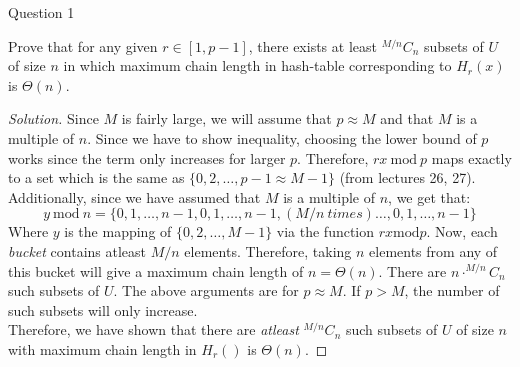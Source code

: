 \begin{solution}{Question 1}\label{ques:1}
    \begin{question}
        Prove that for any given $r \in [1, p-1]$, there exists at least $^{M/n}C_n$ subsets of $U$ of size $n$ in which maximum chain length in hash-table corresponding to $H_r(x)$ is $\Theta(n)$.
    \end{question}
    \tcblower{}
    \begin{proof}[Solution]
      Since $M$ is fairly large, we will assume that $p \approx M$ and that $M$ is a multiple of $n$. Since we have to show inequality, choosing the lower bound of $p$ works since the term only increases for larger $p$. Therefore, $rx\ \text{mod}\ p$ maps exactly to a set which is the same as $\{0, 2, \ldots, p-1 \approx M-1\}$ (from lectures 26, 27). Additionally, since we have assumed that $M$ is a multiple of $n$, we get that:
      \begin{equation}
        y\ \text{mod}\ n = \{0, 1, \ldots, n-1, 0, 1, \ldots, n-1, (M/n\ times)\ldots, 0, 1, \ldots, n-1\}
      \end{equation}
      Where $y$ is the mapping of $\{0, 2, \ldots, M-1\}$ via the function $rx \text{mod} p$. Now, each \textit{bucket} contains atleast $M/n$ elements. Therefore, taking $n$ elements from any of this bucket will give a maximum chain length of $n = \Theta(n)$. There are $n\cdot^{M/n}C_n$ such subsets of $U$. The above arguments are for $p \approx M$. If $p > M$, the number of such subsets will only increase.\\
      Therefore, we have shown that there are \textit{atleast} $^{M/n}C_n$ such subsets of $U$ of size $n$ with maximum chain length in $H_r()$ is $\Theta(n)$.
    \end{proof}
\end{solution}
